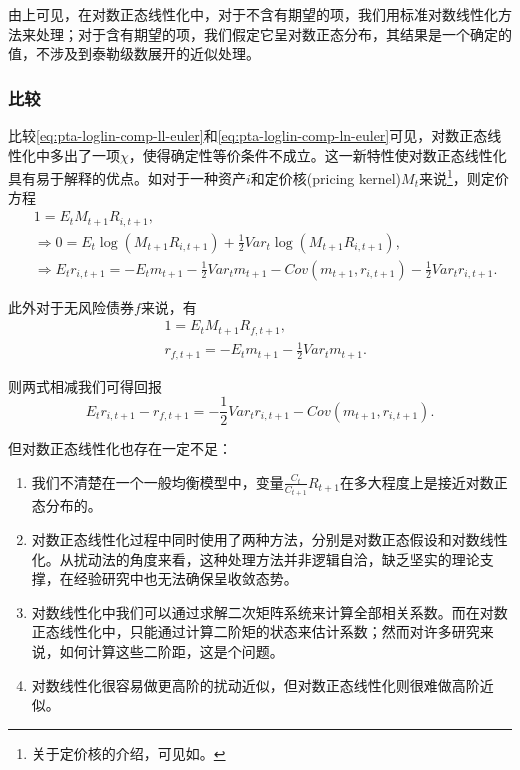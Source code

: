 由上可见，在对数正态线性化中，对于不含有期望的项，我们用标准对数线性化方法来处理；对于含有期望的项，我们假定它呈对数正态分布，其结果是一个确定的值，不涉及到泰勒级数展开的近似处理。

\subsubsection{比较}
  比较\eqref{eq:pta-loglin-comp-ll-euler}和\eqref{eq:pta-loglin-comp-ln-euler}可见，对数正态线性化中多出了一项$\chi$，使得确定性等价条件不成立。这一新特性使对数正态线性化具有易于解释的优点。如对于一种资产$i$和定价核(pricing kernel)$M_t$来说\footnote{关于定价核的介绍，可见如\cite[Ch.1]{Cochrane:2000tr}。}，则定价方程
  \begin{equation*}
    \begin{split}
        &1 = E_t M_{t+1} R_{i,t+1}, \\
        &\Rightarrow 0 = E_t \log \left( M_{t+1} R_{i,t+1} \right) + \frac{1}{2} Var_t \log \left( M_{t+1} R_{i,t+1}   \right),\\
        &\Rightarrow E_t r_{i,t+1} = - E_t m_{t+1} - \frac{1}{2} Var_{t} m_{t+1} - Cov(m_{t+1}, r_{i,t+1}) - \frac{1}{2} Var_t r_{i,t+1}.
       \end{split}
  \end{equation*}

此外对于无风险债券$f$来说，有
\begin{equation*}
  \begin{split}
    &1=E_t M_{t+1} R_{f,t+1}, \\
    &r_{f,t+1} = - E_t m_{t+1} - \frac{1}{2} Var_t m_{t+1}.
  \end{split}
\end{equation*}

则两式相减我们可得回报
\begin{equation*}
  E_t r_{i,t+1} - r_{f,t+1} = -\frac{1}{2} Var_t r_{i,t+1} - Cov(m_{t+1}, r_{i,t+1}).
\end{equation*}

但对数正态线性化也存在一定不足：
\begin{enumerate}
  \item 我们不清楚在一个一般均衡模型中，变量$\frac{C_t}{C_{t+1}}R_{t+1}$在多大程度上是接近对数正态分布的。
  \item 对数正态线性化过程中同时使用了两种方法，分别是对数正态假设和对数线性化。从扰动法的角度来看，这种处理方法并非逻辑自洽，缺乏坚实的理论支撑，在经验研究中也无法确保呈收敛态势。
  \item 对数线性化中我们可以通过求解二次矩阵系统来计算全部相关系数。而在对数正态线性化中，只能通过计算二阶矩的状态来估计系数；然而对许多研究来说，如何计算这些二阶距，这是个问题。
  \item 对数线性化很容易做更高阶的扰动近似，但对数正态线性化则很难做高阶近似。
\end{enumerate}

